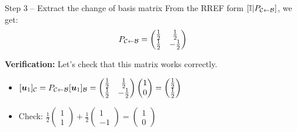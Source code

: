\documentclass[aspectratio=169]{beamer}\usepackage[]{graphicx}\usepackage[]{xcolor}
\begin{document}
\begin{frame}{Step 3 -- Extract the change of basis matrix}
From the RREF form $[\mathbb{I}|P_{\mathcal{C}\leftarrow\mathcal{B}}]$, we get:
$$P_{\mathcal{C}\leftarrow\mathcal{B}} = \begin{pmatrix} \frac{1}{2} & \frac{1}{2} \\ \frac{1}{2} & -\frac{1}{2} \end{pmatrix}$$

\vfill
\textbf{Verification:} Let's check that this matrix works correctly.
\begin{itemize}
\item $[\bm{u}_1]_{\mathcal{C}} = P_{\mathcal{C}\leftarrow\mathcal{B}}[\bm{u}_1]_{\mathcal{B}} = \begin{pmatrix} \frac{1}{2} & \frac{1}{2} \\ \frac{1}{2} & -\frac{1}{2} \end{pmatrix}\begin{pmatrix} 1 \\ 0 \end{pmatrix} = \begin{pmatrix} \frac{1}{2} \\ \frac{1}{2} \end{pmatrix}$
\item Check: $\frac{1}{2}\begin{pmatrix} 1 \\ 1 \end{pmatrix} + \frac{1}{2}\begin{pmatrix} 1 \\ -1 \end{pmatrix} = \begin{pmatrix} 1 \\ 0 \end{pmatrix}$
\end{itemize}
\end{frame}
\end{document}
